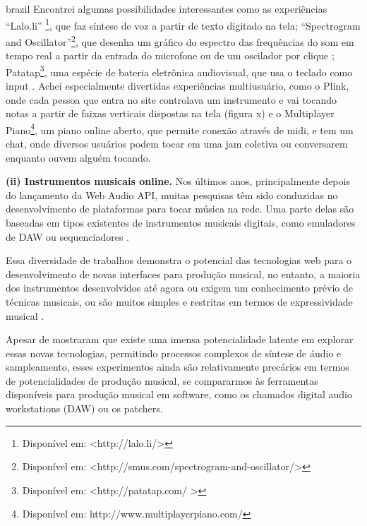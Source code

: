 \begin{otherlanguage*}{brazil}
Encontrei algumas possibilidades interessantes como as experiências ``Lalo.li'' \footnote{Disponível em: <http://lalo.li/> }, que faz síntese de voz a partir de texto digitado na tela; ``Spectrogram and Oscillator''\footnote{Disponível em: <http://smus.com/spectrogram-and-oscillator/>}, que desenha um gráfico do espectro das frequências do som em tempo real a partir da entrada do microfone ou de um oscilador por clique ; Patatap\footnote{Disponível em: <http://patatap.com/ >}, uma espécie de bateria eletrônica audiovisual, que usa o teclado como input . Achei especialmente divertidas experiências multiusuário, como o Plink, onde cada pessoa que entra no site controlava um instrumento e vai tocando notas a partir de faixas verticais dispostas na tela (figura x) e o Multiplayer Piano\footnote{Disponível em: http://www.multiplayerpiano.com/}, um piano online aberto, que permite conexão através de midi, e tem um chat, onde diversos usuários podem tocar em uma jam coletiva ou conversarem enquanto ouvem alguém tocando.


\textbf{(ii) Instrumentos musicais online.} Nos últimos anos, principalmente depois do lançamento da Web Audio API, muitas pesquisas têm sido conduzidas no desenvolvimento de plataformas para tocar música na rede. Uma parte delas são baseadas em tipos existentes de instrumentos musicais digitais, como emuladores de DAW \cite{Jillings2017} ou sequenciadores \cite{Feenstra2016}.

Essa diversidade de trabalhos demonstra o potencial das tecnologias web para o desenvolvimento de novas interfaces para produção musical, no entanto, a maioria dos instrumentos desenvolvidos até agora ou exigem um conhecimento prévio de técnicas musicais, ou são muitos simples e restritas em termos de expressividade musical \cite{Dobrian2006}. 


Apesar de mostraram que existe uma imensa potencialidade latente em explorar essas novas tecnologias, permitindo processos complexos de síntese de áudio e sampleamento, esses experimentos ainda são relativamente precários em termos de potencialidades de produção musical, se compararmos às ferramentas disponíveis para produção musical em software, como os chamados digital audio workstations (DAW) ou os patchers.

\end{otherlanguage*}
